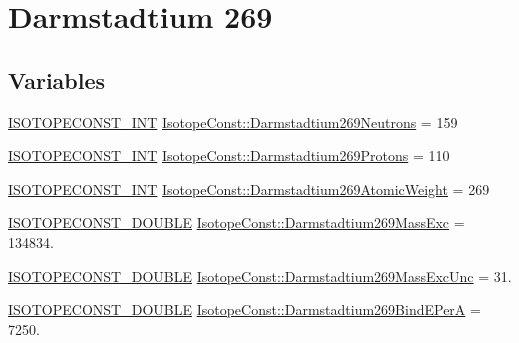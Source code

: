 \hypertarget{group___isotope_const-_darmstadtium-_ds269}{}\section{Darmstadtium 269}
\label{group___isotope_const-_darmstadtium-_ds269}
\subsection*{Variables}
\begin{DoxyCompactItemize}
\item 
\mbox{\hyperlink{group___isotope_const-_macros_ga5f18360b3e99483a35c32d789e62621c}{I\+S\+O\+T\+O\+P\+E\+C\+O\+N\+S\+T\+\_\+\+I\+NT}} \mbox{\hyperlink{group___isotope_const-_darmstadtium-_ds269_ga5da5e5bb6105532c7fae84515901b6d7}{Isotope\+Const\+::\+Darmstadtium269\+Neutrons}} = 159
\item 
\mbox{\hyperlink{group___isotope_const-_macros_ga5f18360b3e99483a35c32d789e62621c}{I\+S\+O\+T\+O\+P\+E\+C\+O\+N\+S\+T\+\_\+\+I\+NT}} \mbox{\hyperlink{group___isotope_const-_darmstadtium-_ds269_gaf17d095cad72706ba32381d72b86b25c}{Isotope\+Const\+::\+Darmstadtium269\+Protons}} = 110
\item 
\mbox{\hyperlink{group___isotope_const-_macros_ga5f18360b3e99483a35c32d789e62621c}{I\+S\+O\+T\+O\+P\+E\+C\+O\+N\+S\+T\+\_\+\+I\+NT}} \mbox{\hyperlink{group___isotope_const-_darmstadtium-_ds269_ga9310eceab44f2c786b153033a358255a}{Isotope\+Const\+::\+Darmstadtium269\+Atomic\+Weight}} = 269
\item 
\mbox{\hyperlink{group___isotope_const-_macros_ga8f45a7272ce02c0b4c65c44636ed719a}{I\+S\+O\+T\+O\+P\+E\+C\+O\+N\+S\+T\+\_\+\+D\+O\+U\+B\+LE}} \mbox{\hyperlink{group___isotope_const-_darmstadtium-_ds269_ga31857866aa264f8e3c61b894ee1acc8d}{Isotope\+Const\+::\+Darmstadtium269\+Mass\+Exc}} = 134834.
\item 
\mbox{\hyperlink{group___isotope_const-_macros_ga8f45a7272ce02c0b4c65c44636ed719a}{I\+S\+O\+T\+O\+P\+E\+C\+O\+N\+S\+T\+\_\+\+D\+O\+U\+B\+LE}} \mbox{\hyperlink{group___isotope_const-_darmstadtium-_ds269_ga2e55c2bdc8bd2f21dbb39f91a6175835}{Isotope\+Const\+::\+Darmstadtium269\+Mass\+Exc\+Unc}} = 31.
\item 
\mbox{\hyperlink{group___isotope_const-_macros_ga8f45a7272ce02c0b4c65c44636ed719a}{I\+S\+O\+T\+O\+P\+E\+C\+O\+N\+S\+T\+\_\+\+D\+O\+U\+B\+LE}} \mbox{\hyperlink{group___isotope_const-_darmstadtium-_ds269_ga21f698066a2a0cea2f6f39242f8859b3}{Isotope\+Const\+::\+Darmstadtium269\+Bind\+E\+PerA}} = 7250.

\end{DoxyCompactItemize}
